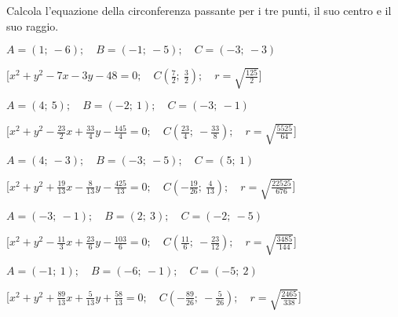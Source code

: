 \begin{esercizio}\label{ese:}
 Calcola l'equazione della circonferenza passante per i tre punti, il suo 
centro e il suo raggio.
 \begin{enumeratea}
\item  \(A = \left (1;~-6 \right ); \quad B = \left (-1;~-5 \right ); \quad 
C = \left (-3;~-3 \right )\)

\hfill [\(x^2 + y^2 -7x -3y -48 = 0; \quad 
C \left (\frac{7}{2};~\frac{3}{2} \right ); \quad 
r = \sqrt{\frac{125}{2}}\)]

\item  \(A = \left (4;~5 \right ); \quad B = \left (-2;~1 \right ); \quad 
C = \left (-3;~-1 \right )\)

\hfill [\(x^2 + y^2 -\frac{23}{2}x +\frac{33}{4}y -\frac{145}{4} = 0; \quad 
C \left (\frac{23}{4};~-\frac{33}{8} \right ); \quad 
r = \sqrt{\frac{5525}{64}}\)]

\item  \(A = \left (4;~-3 \right ); \quad B = \left (-3;~-5 \right ); \quad 
C = \left (5;~1 \right )\)

\hfill [\(x^2 + y^2 +\frac{19}{13}x -\frac{8}{13}y -\frac{425}{13} = 0; \quad
C \left (-\frac{19}{26};~\frac{4}{13} \right ); \quad
r = \sqrt{\frac{22525}{676}}\)]

\item  \(A = \left (-3;~-1 \right ); \quad B = \left (2;~3 \right ); \quad 
C = \left (-2;~-5 \right )\)

\hfill [\(x^2 + y^2 -\frac{11}{3}x +\frac{23}{6}y -\frac{103}{6} = 0; \quad
C \left (\frac{11}{6};~-\frac{23}{12} \right ); \quad
r = \sqrt{\frac{3485}{144}}\)]

\item  \(A = \left (-1;~1 \right ); \quad B = \left (-6;~-1 \right ); \quad 
C = \left (-5;~2 \right )\)

\hfill [\(x^2 + y^2 +\frac{89}{13}x +\frac{5}{13}y +\frac{58}{13} = 0; \quad
C \left (-\frac{89}{26};~-\frac{5}{26} \right ); \quad
r = \sqrt{\frac{2465}{338}}\)]


\end{enumeratea}
\end{esercizio}
